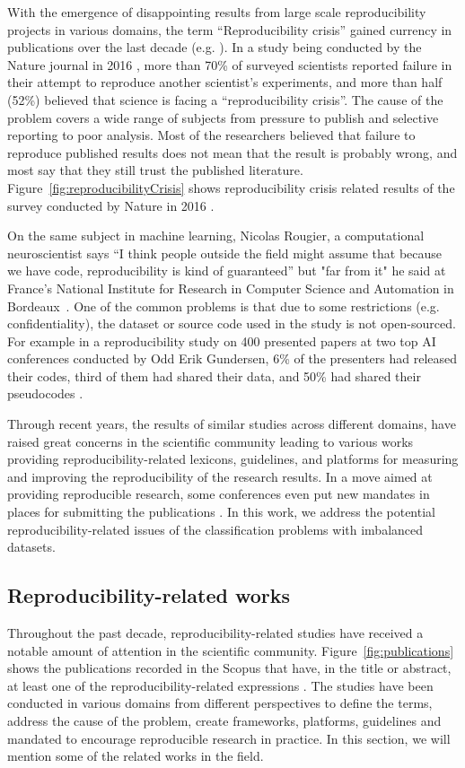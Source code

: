 With the emergence of disappointing results from large scale reproducibility projects in various domains, the term 
“Reproducibility crisis” gained currency in publications over the last decade (e.g. \cite{pashler_editors_2012}). 
In a study being conducted by the Nature journal in 2016 \cite{baker_1500_2016}, more than 70\% of surveyed scientists 
reported failure in their attempt to reproduce another scientist's experiments, and more than half (52\%) believed 
that science is facing a “reproducibility crisis”. The cause of the problem covers a wide range of subjects from 
pressure to publish and selective reporting to poor analysis. Most of the researchers believed that failure to reproduce 
published results does not mean that the result is probably wrong, and most say that they still trust the published 
literature. Figure~\ref{fig:reproducibilityCrisis} shows reproducibility crisis related  results of the survey 
conducted by Nature in 2016 .

On the same subject in machine learning, Nicolas Rougier, a computational neuroscientist says “I think people 
outside the field might assume that because we have code, reproducibility is kind of 
guaranteed” but "far from it" he said at France's National Institute for Research in Computer Science 
and Automation in Bordeaux~\cite{hutson_artificial_2018}. 
One of the common problems is that due to some restrictions (e.g. confidentiality), 
the dataset or source code used in the study is not open-sourced.  For example in a reproducibility study on 400 
presented papers at two top AI conferences conducted by Odd Erik Gundersen, 6\% of the presenters had released 
their codes, third of them had shared their data, and 50\% had shared their pseudocodes \cite{gundersen_state_2018}.

Through recent years, the results of similar studies across different domains, have raised great concerns in the scientific 
community leading to various works providing reproducibility-related lexicons, guidelines, and platforms for measuring and 
improving the reproducibility of the research results. In a move aimed at providing reproducible research, some conferences 
even put new mandates in places for submitting the publications 
\cite{pineau_improving_2020,goodman_what_2016,tatman_practical_2018}. In this work, we address the potential 
reproducibility-related issues of the classification problems with imbalanced datasets. 

\subsection{Reproducibility-related works}
Throughout the past decade, reproducibility-related studies have received a notable amount of attention in the 
scientific community. Figure~\ref{fig:publications} shows the publications recorded in the Scopus that have, in the title or abstract, 
at least one of the reproducibility-related expressions \cite{goodman_what_2016}. The studies have been conducted in 
various domains from different perspectives to define the terms, address the cause of the problem, create frameworks, 
platforms, guidelines and mandated to encourage reproducible research in practice. In this section, we will mention 
some of the related works in the field.


